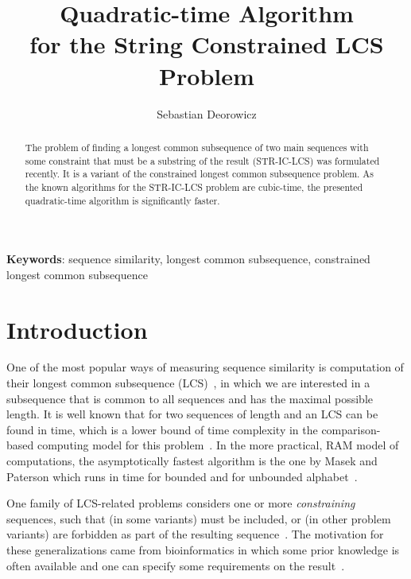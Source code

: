 \documentclass[12pt]{article}
\title{Quadratic-time Algorithm\\for the String Constrained LCS Problem}
\author{Sebastian Deorowicz}
\begin{document}
\maketitle

\begin{abstract}
The problem of finding a longest common subsequence of two main sequences with some constraint that must be a substring of the result (STR-IC-LCS) was formulated recently.
It is a variant of the constrained longest common subsequence problem.
As the known algorithms for the STR-IC-LCS problem are cubic-time, the presented quadratic-time algorithm is significantly faster.
\end{abstract}

{\bfseries Keywords}: sequence similarity, longest common subsequence, constrained longest common subsequence

\section{Introduction}

One of the most popular ways of measuring sequence similarity is computation of their longest common subsequence (LCS)~\cite{Gus1997}, in which we are interested in a subsequence that is common to all sequences and has the maximal possible length.
It is well known that for two sequences of length  and  an LCS can be found in  time, which is a lower bound of time complexity in the comparison-based computing model for this problem~\cite{AHU1976}.
In the more practical, RAM model of computations, the asymptotically fastest algorithm is the one by Masek and Paterson which runs in  time for bounded and  for unbounded alphabet~\cite{MP1980}.

One family of LCS-related problems considers one or more {\em constraining} sequences, such that (in some variants) must be included, or (in other problem variants) are forbidden as part of the resulting sequence~\cite{CC2011,Tsa2003}.
The motivation for these generalizations came from bioinformatics in which some prior knowledge is often available and one can specify some requirements on the result~\cite{Tsa2003,Deo2010a}.
\end{document}
